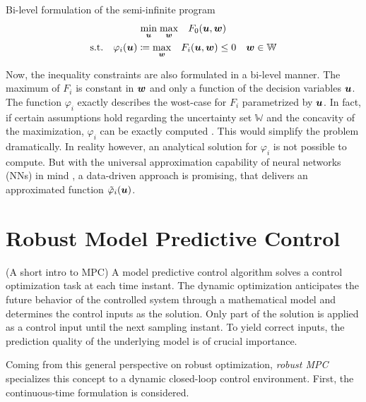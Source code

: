 \begin{definition} Bi-level formulation of the semi-infinite program
    \label{theroy:def: bi-level program}
    \[
    \begin{gathered}
        \underset{{\bm{u}}}{\min} \; \underset{{\bm{w}}}{\max} \quad F_0({\bm{u}}, {\bm{w}}) \\
        \text{s.t.} \quad \varphi_i({\bm{u}}) \coloneq \underset{{\bm{w}}}{\max} \quad F_i({\bm{u}}, {\bm{w}}) \leq 0
        \quad {\bm{w}} \in \mathbb{W}
    \end{gathered}
    \]
\end{definition}

Now, the inequality constraints are also formulated in a bi-level manner. The maximum of $F_i$ is 
constant in ${\bm{w}}$ and only a function of the decision variables ${\bm{u}}$. The function $\varphi_i$
exactly describes the wost-case for $F_i$ parametrized by ${\bm{u}}$. In fact, if certain assumptions hold
regarding the uncertainty set $\mathbb{W}$ and the concavity of the maximization,
$\varphi_i$ can be exactly computed \cite{empty000}. This would simplify the problem dramatically.
In reality however, an analytical solution for $\varphi_i$ is not possible to compute.
But with the universal approximation capability of neural networks (NNs) in mind \cite{hornik1990}, 
a data-driven approach is promising, that delivers an approximated function $\tilde{\varphi}_i({\bm{u}})$.

\section{Robust Model Predictive Control}

(A short intro to MPC)
A model predictive control algorithm solves a control optimization task at each time instant.
The dynamic optimization anticipates the future behavior of the controlled system through
a mathematical model and determines the control inputs as the solution. Only part of the 
solution is applied as a control input until the next sampling instant. To yield correct inputs,
the prediction quality of the underlying model is of crucial importance.
\newline
\newline

Coming from this general perspective on robust optimization, \emph{robust MPC} specializes
this concept to a dynamic closed-loop control environment. First, the continuous-time
formulation is considered.

